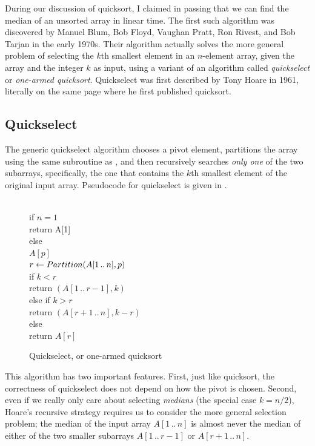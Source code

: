 During our discussion of quicksort, I claimed in passing that we can find the median of an unsorted array in linear time. The first such algorithm was discovered by Manuel Blum, Bob Floyd, Vaughan Pratt, Ron Rivest, and Bob Tarjan in the early 1970s. Their algorithm actually solves the more general problem of selecting the $k$th smallest element in an $n$-element array, given the array and the integer $k$ as input, using a variant of an algorithm called \emph{quickselect} or \emph{one-armed quicksort}. Quickselect was first described by Tony Hoare in 1961, literally on the same page where he first published quicksort.

\subsection{Quickselect}
The generic quickselect algorithm chooses a pivot element, partitions the array using the same  subroutine as , and then recursively searches \emph{only one} of the two subarrays, specifically, the one that contains the $k$th smallest element of the original input array. Pseudocode for quickselect is given in .

\begin{figure}[ht]
\centering
\begin{pseudocode}
\\
if $n = 1$\\
\Indent return A[1]\\
else\\
 $A[p]$\\
\Indent $r \gets Partition(A[1\,..\,n], p)$\\
\Indent if $k < r$\\
\Indent\Indent return $(A[1\,..\,r-1], k)$\\
\Indent else if $k > r$\\
\Indent\Indent return $(A[r+1\,..\,n], k-r)$\\
\Indent else\\
\Indent\Indent return $A[r]$
\end{pseudocode}
\caption{Quickselect, or one-armed quicksort}
\label{fig:1.12}
\end{figure}
This algorithm has two important features. First, just like quicksort, the correctness of quickselect does not depend on how the pivot is chosen. Second, even if we really only care about selecting \emph{medians} (the special case $k = n/2$), Hoare’s recursive strategy requires us to consider the more general selection problem; the median of the input array $A[1\,..\,n]$ is almost never the median of either of the two smaller subarrays $A[1\,..\,r - 1]$ or $A[r + 1\,..\,n]$.

